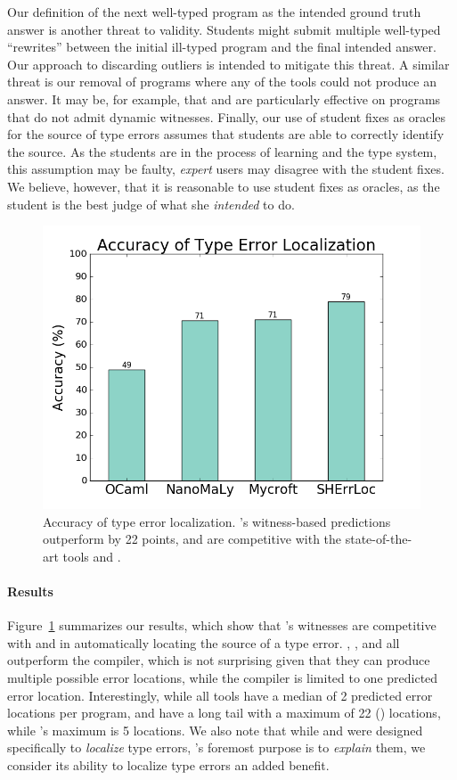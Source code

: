 Our definition of the next well-typed program as the intended ground
truth answer is another threat to validity. Students might submit
multiple well-typed ``rewrites'' between the initial ill-typed program
and the final intended answer.
%
Our approach to discarding outliers is intended to mitigate this threat.
%
A similar threat is our removal of programs where any of the tools could
not produce an answer.
%
It may be, for example, that \mycroft and \sherrloc are particularly
effective on programs that do not admit dynamic witnesses.
%
Finally, our use of student fixes as oracles for the source of type
errors assumes that students are able to correctly identify the source.
%
As the students are in the process of learning \ocaml and the type
system, this assumption may be faulty, \emph{expert} users may disagree
with the student fixes.
%
We believe, however, that it is reasonable to use student fixes as
oracles, as the student is the best judge of what she \emph{intended} to
do.

\begin{figure}[t]
\includegraphics[width=0.7\linewidth]{nanomaly/blame.png}
\caption{Accuracy of type error localization. \toolname's witness-based
  predictions outperform \ocaml by 22 points, and are competitive
  with the state-of-the-art tools \mycroft and \sherrloc.}
\label{fig:results-blame}
\end{figure}

\paragraph{Results}
Figure~\ref{fig:results-blame} summarizes our results, which show that
\toolname's witnesses are competitive with \mycroft and \sherrloc in
automatically locating the source of a type error.
%
\toolname, \mycroft, and \sherrloc all outperform the \ocaml compiler,
which is not surprising given that they can produce multiple possible
error locations, while the \ocaml compiler is limited to one predicted
error location.
%
Interestingly, while all tools have a median of 2 predicted error
locations per program, \mycroft and \sherrloc have a long tail with a
maximum of 22 () locations, while \toolname's maximum is 5
locations.
%
We also note that while \mycroft and \sherrloc were designed
specifically to \emph{localize} type errors, \toolname's foremost
purpose is to \emph{explain} them, we consider its ability to localize
type errors an added benefit.

